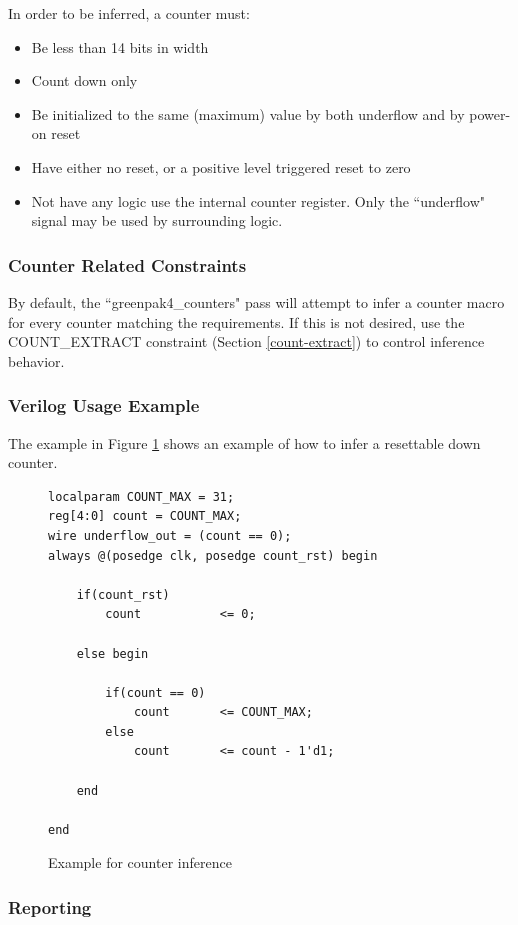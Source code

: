 \documentclass{article}
\begin{document}
In order to be inferred, a counter must:

\begin{itemize}
\item Be less than 14 bits in width
\item Count down only
\item Be initialized to the same (maximum) value by both underflow and by power-on reset
\item Have either no reset, or a positive level triggered reset to zero
\item Not have any logic use the internal counter register. Only the ``underflow" signal may be used by surrounding logic.
\end{itemize}

\subsubsection{Counter Related Constraints}

By default, the ``greenpak4\_counters" pass will attempt to infer a counter macro for every counter matching the 
requirements. If this is not desired, use the COUNT\_EXTRACT constraint (Section \ref{count-extract}) to control 
inference behavior.

\clearpage
\subsubsection{Verilog Usage Example}

The example in Figure \ref{gp-countinfer-example} shows an example of how to infer a resettable down counter.

\begin{figure}[h]
\begin{lstlisting}
localparam COUNT_MAX = 31;
reg[4:0] count = COUNT_MAX;
wire underflow_out = (count == 0);
always @(posedge clk, posedge count_rst) begin
	
	if(count_rst)
		count			<= 0;
	
	else begin

		if(count == 0)
			count		<= COUNT_MAX;
		else
			count		<= count - 1'd1;

	end
	
end
\end{lstlisting}
\caption{Example for counter inference}
\label{gp-countinfer-example}
\end{figure}

\subsubsection{Reporting}
\end{document}
